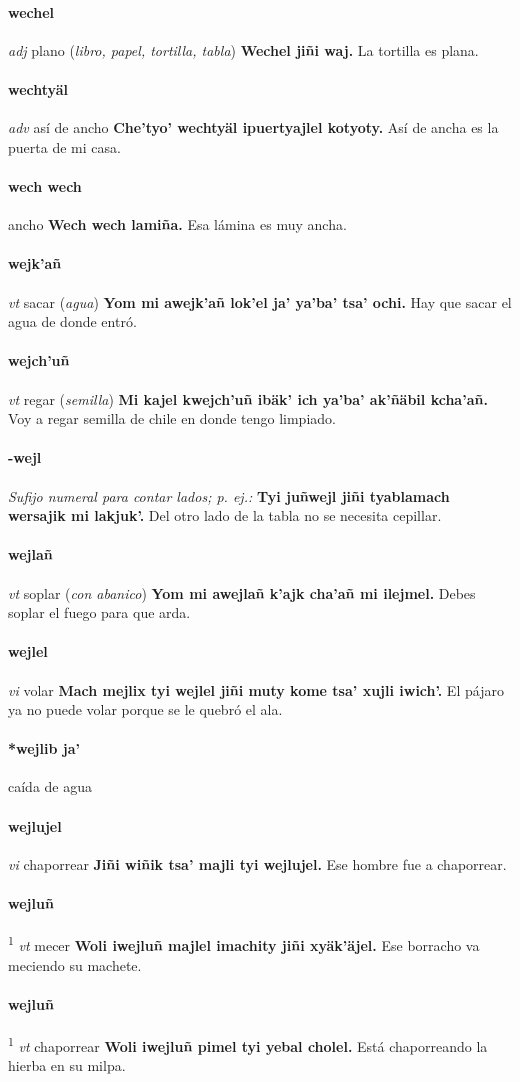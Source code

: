 \documentclass{scrbook}
\newcommand{\entry}[1]{\paragraph{#1}}
\newcommand{\defsuperscript}[1]{\textsuperscript{1}}
\newcommand{\nontranslationdef}[1]{\textit{#1}}
\newcommand{\partofspeech}[1]{\textit{#1}}
\newcommand{\spanishtranslation}[1]{#1}
\newcommand{\clarification}[1]{(\textit{#1})}
\newcommand{\cholexample}[1]{\textbf{#1}}
\newcommand{\exampletranslation}[1]{#1}
\begin{document}
\begin{multicols}{2}
\entry{wechel}
\partofspeech{adj}
\spanishtranslation{plano}
\clarification{libro, papel, tortilla, tabla}
\cholexample{Wechel jiñi waj.}
\exampletranslation{La tortilla es plana.}

\entry{wechtyäl}
\partofspeech{adv}
\spanishtranslation{así de ancho}
\cholexample{Che'tyo' wechtyäl ipuertyajlel kotyoty.}
\exampletranslation{Así de ancha es la puerta de mi casa.}

\entry{wech wech}
\spanishtranslation{ancho}
\cholexample{Wech wech lamiña.}
\exampletranslation{Esa lámina es muy ancha.}

\entry{wejk'añ}
\partofspeech{vt}
\spanishtranslation{sacar}
\clarification{agua}
\cholexample{Yom mi awejk'añ lok'el ja' ya'ba' tsa' ochi.}
\exampletranslation{Hay que sacar el agua de donde entró.}

\entry{wejch'uñ}
\partofspeech{vt}
\spanishtranslation{regar}
\clarification{semilla}
\cholexample{Mi kajel kwejch'uñ ibäk' ich ya'ba' ak'ñäbil kcha'añ.}
\exampletranslation{Voy a regar semilla de chile en donde tengo limpiado.}

\entry{-wejl}
\nontranslationdef{Sufijo numeral para contar lados; p. ej.:}
\cholexample{Tyi juñwejl jiñi tyablamach wersajik mi lakjuk'.}
\exampletranslation{Del otro lado de la tabla no se necesita cepillar.}

\entry{wejlañ}
\partofspeech{vt}
\spanishtranslation{soplar}
\clarification{con abanico}
\cholexample{Yom mi awejlañ k'ajk cha'añ mi ilejmel.}
\exampletranslation{Debes soplar el fuego para que arda.}

\entry{wejlel}
\partofspeech{vi}
\spanishtranslation{volar}
\cholexample{Mach mejlix tyi wejlel jiñi muty kome tsa' xujli iwich'.}
\exampletranslation{El pájaro ya no puede volar porque se le quebró el ala.}

\entry{*wejlib ja'}
\spanishtranslation{caída de agua}

\entry{wejlujel}
\partofspeech{vi}
\spanishtranslation{chaporrear}
\cholexample{Jiñi wiñik tsa' majli tyi wejlujel.}
\exampletranslation{Ese hombre fue a chaporrear.}

\entry{wejluñ}
\defsuperscript{1}
\partofspeech{vt}
\spanishtranslation{mecer}
\cholexample{Woli iwejluñ majlel imachity jiñi xyäk'äjel.}
\exampletranslation{Ese borracho va meciendo su machete.}

\entry{wejluñ}
\defsuperscript{2}
\partofspeech{vt}
\spanishtranslation{chaporrear}
\cholexample{Woli iwejluñ pimel tyi yebal cholel.}
\exampletranslation{Está chaporreando la hierba en su milpa.}


\end{multicols}
\end{document}
